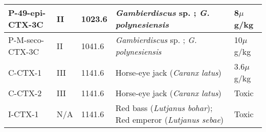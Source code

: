 \documentclass[12pt]{article}
\begin{document}
\begin{sidewaystable}[!htbp]
\begin{tabular}{ |  p{4cm} | p{2cm} | p{2cm} | p{6cm} | p{6cm} | }
\hline
 P-49-epi-CTX-3C & II & 1023.6 \cite{chinain2010growth} & \emph{Gambierdiscus} sp. \cite{satake1993structure}; \emph{G. polynesiensis} \cite{chinain2010growth} & 8$\mu$g/kg\cite{chinain2010growth}\\
\hline
 P-M-seco-CTX-3C & II & 1041.6 \cite{chinain2010growth} &\emph{Gambierdiscus} sp. \cite{satake1993structure}; \emph{G. polynesiensis} \cite{chinain2010growth} & 10$\mu$g/kg \cite{chinain2010growth}\\
\hline
 C-CTX-1 & III & 1141.6 \cite{vernoux1997isolation,pottier2002characterisation} & Horse-eye jack (\emph{Caranx latus}) \cite{vernoux1997isolation,pottier2002characterisation} & 3.6$\mu$g/kg \cite{vernoux1997isolation}\\
\hline
 C-CTX-2 & III & 1141.6 \cite{vernoux1997isolation,pottier2002characterisation}& Horse-eye jack (\emph{Caranx latus}) \cite{vernoux1997isolation,pottier2002characterisation} & Toxic \cite{vernoux1997isolation}\\
\hline
 I-CTX-1 & N/A & 1141.6 \cite{hamilton2002isolation}& Red bass (\emph{Lutjanus bohar}); Red emperor (\emph{Lutjanus sebae}) \cite{hamilton2002isolation} & Toxic \cite{hamilton2002isolation} \\
\hline
\end{tabular}
\end{sidewaystable}
\FloatBarrier
\end{document}
